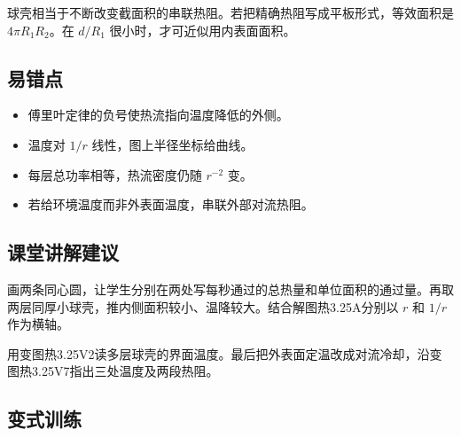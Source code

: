 \documentclass[UTF8,fontset=fandol,a4paper,11pt]{ctexart}
\begin{document}
球壳相当于不断改变截面积的串联热阻。若把精确热阻写成平板形式，等效面积是 $4\pi R_1R_2$。在 $d/R_1$ 很小时，才可近似用内表面面积。



\subsection*{易错点}

\begin{itemize}
\item 傅里叶定律的负号使热流指向温度降低的外侧。
\item 温度对 $1/r$ 线性，图上半径坐标给曲线。
\item 每层总功率相等，热流密度仍随 $r^{-2}$ 变。
\item 若给环境温度而非外表面温度，串联外部对流热阻。
\end{itemize}



\subsection*{课堂讲解建议}

画两条同心圆，让学生分别在两处写每秒通过的总热量和单位面积的通过量。再取两层同厚小球壳，推内侧面积较小、温降较大。结合解图热3.25A分别以 $r$ 和 $1/r$ 作为横轴。

用变图热3.25V2读多层球壳的界面温度。最后把外表面定温改成对流冷却，沿变图热3.25V7指出三处温度及两段热阻。



\subsection*{变式训练}
\end{document}
